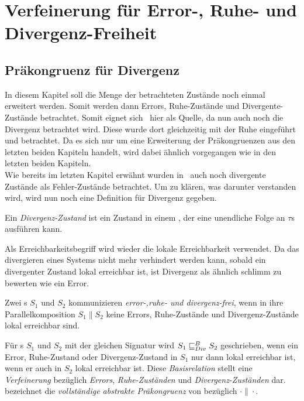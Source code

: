 \chapter{Verfeinerung für Error-, Ruhe- und Divergenz-Freiheit}

\section{Präkongruenz für Divergenz}

In diesem Kapitel soll die Menge der betrachteten Zustände noch einmal
erweitert werden. Somit werden dann Errors, Ruhe-Zustände und
Divergente-Zustände betrachtet. Somit eignet sich~\cite{Chilton2013} hier als
Quelle, da nun auch noch die Divergenz betrachtet wird. Diese wurde dort
gleichzeitig mit der Ruhe eingeführt und betrachtet. Da es sich nur um eine
Erweiterung der Präkongruenzen aus den letzten beiden Kapiteln handelt, wird
dabei ähnlich vorgegangen wie in den letzten beiden Kapiteln.\\
Wie bereits im letzten Kapitel erwähnt wurden in~\cite{Chilton2013} auch noch
divergente Zustände als Fehler-Zustände betrachtet. Um zu klären, was darunter
verstanden wird, wird nun noch eine Definition für Divergenz gegeben.

\begin{Def}[Divergenz]
  Ein \emph{Divergenz-Zustand} ist ein Zustand in einem \EIO{}, der eine
  unendliche Folge an $\tau$s ausführen kann. %
\end{Def}

Als Erreichbarkeitsbegriff wird wieder die lokale Erreichbarkeit verwendet.
Da das divergieren eines Systems nicht mehr verhindert werden kann, sobald ein
divergenter Zustand lokal erreichbar ist, ist Divergenz als ähnlich
\glqq{}schlimm\grqq{} zu bewerten wie ein Error.

\begin{Def}
  Zwei \EIO{}s $S_1$ und $S_2$ kommunizieren \emph{error-,ruhe- und
  divergenz-frei}, wenn in ihre Parallelkomposition $S_1\|S_2$ keine Errors,
  Ruhe-Zustände und Divergenz-Zustände lokal erreichbar sind.
\end{Def}

\begin{Def}
Für \EIO{}s $S_1$ und $S_2$ mit der gleichen Signatur wird $S_1\sqsubseteq _{Div}^B S_2$
geschrieben, wenn ein Error, Ruhe-Zustand oder Divergenz-Zustand in $S_1$ nur
dann lokal erreichbar ist, wenn er auch in $S_2$ lokal erreichbar ist. Diese
\emph{Basisrelation} stellt eine \emph{Verfeinerung} bezüglich \emph{Errors},
\emph{Ruhe-Zuständen} und \emph{Divergenz-Zuständen} dar.\\
\DCRel{} bezeichnet die \emph{vollständige abstrakte Präkongruenz} von \DBRel{}
bezüglich $\cdot\|\cdot$.
\end{Def}

